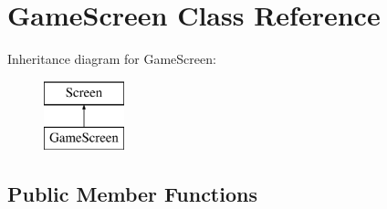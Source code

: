 \hypertarget{classGameScreen}{}\section{Game\+Screen Class Reference}
\label{classGameScreen}
Inheritance diagram for Game\+Screen\+:\begin{figure}[H]
\begin{center}
\leavevmode
\includegraphics[height=2.000000cm]{classGameScreen}
\end{center}
\end{figure}
\subsection*{Public Member Functions}

